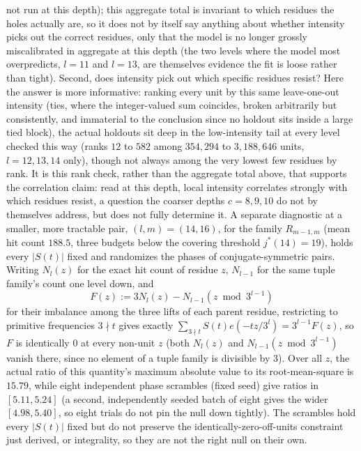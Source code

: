 \documentclass[11pt]{amsart}
\theoremstyle{plain}
\theoremstyle{definition}
\theoremstyle{remark}
\begin{document}
not run at this depth); this aggregate total is invariant to which residues the holes actually are,
so it does not by itself say anything about whether intensity picks out the correct residues, only
that the model is no longer grossly miscalibrated in aggregate at this depth (the two levels where
the model most overpredicts, $l=11$ and $l=13$, are themselves evidence the fit is loose rather than tight).
Second, does intensity pick out which specific residues resist? Here the answer is more informative:
ranking every unit
by this same leave-one-out intensity (ties, where the integer-valued sum coincides, broken
arbitrarily but consistently, and immaterial to the conclusion since no holdout sits inside a large
tied block), the actual holdouts sit deep in the low-intensity tail at every
level checked this way (ranks $12$ to $582$ among $354{,}294$ to $3{,}188{,}646$ units, $l=12,13,14$
only),
though not always among the very lowest few residues by rank. It is this rank check, rather than the
aggregate
total above, that supports the correlation claim: read at this depth, local intensity
correlates strongly with which residues resist, a question the coarser depths $c=8,9,10$ do not by
themselves address, but does not fully determine it. A separate
diagnostic at a smaller, more tractable
pair, $(l,m)=(14,16)$, for the family $R_{m-1,m}$ (mean hit count $188.5$, three budgets below the
covering threshold $j^*(14)=19$), holds every $|S(t)|$ fixed and randomizes the phases of
conjugate-symmetric pairs. Writing $N_l(z)$ for the exact hit count of residue $z$, $N_{l-1}$ for
the same tuple family's count one level down, and
\[
F(z) := 3N_l(z)-N_{l-1}(z\bmod3^{l-1})
\]
for their imbalance among the three lifts of each parent residue, restricting to primitive
frequencies $3\nmid t$ gives exactly $\sum_{3\nmid t}S(t)e(-tz/3^l) = 3^{l-1}F(z)$, so $F$ is
identically $0$ at every
non-unit $z$ (both $N_l(z)$ and $N_{l-1}(z\bmod3^{l-1})$ vanish there, since no element of a
tuple family is divisible by $3$). Over all $z$, the actual ratio
of this quantity's maximum absolute value to its root-mean-square is $15.79$, while eight
independent phase scrambles (fixed seed)
give ratios in $[5.11,5.24]$ (a second, independently seeded batch of eight gives the wider
$[4.98,5.40]$, so eight trials do not pin the null down tightly). The scrambles hold every $|S(t)|$
fixed but do not preserve the
identically-zero-off-units constraint just derived, or integrality, so they are not the right null on
their own.
\end{document}
